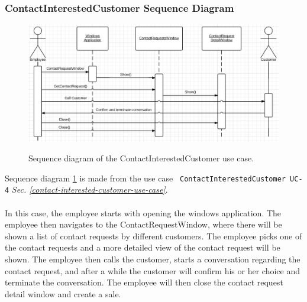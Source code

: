 \subsubsection{ContactInterestedCustomer Sequence Diagram}
\begin{figure}[H]
	\centering
		\includegraphics[width=\textwidth]{Figures/SequenceDiagram-ContactInterestedCustomer}\\
	\caption{Sequence diagram of the ContactInterestedCustomer use case.}
  \label{fig:SequenceDiagram-ContactInterestedCustomer}
\end{figure}

Sequence diagram \ref{fig:SequenceDiagram-ContactInterestedCustomer} is made from the use case \texttt{ ContactInterestedCustomer UC-4} \textit{Sec. \ref{contact-interested-customer-use-case}}. \\\\
In this case, the employee starts with opening the windows application. The employee then navigates to the ContactRequestWindow, where there will be shown a list of contact requests by different customers. The employee picks one of the contact requests and a more detailed view of the contact request will be shown. The employee then calls the customer, starts a conversation regarding the contact request, and after a while the customer will confirm his or her choice and terminate the conversation. The employee will then close the contact request detail window and create a sale.

